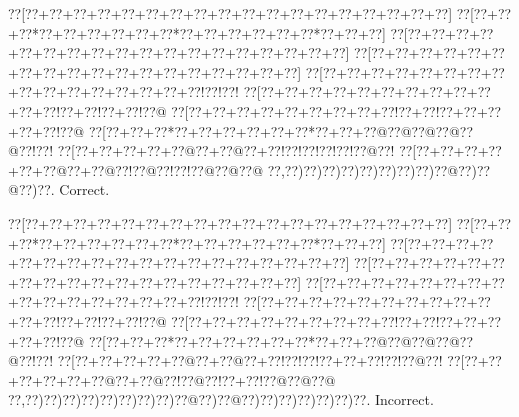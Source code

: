 \documentclass[a5paper]{article}
\begin{document}
\begin{center}
{\goo
\0??[\0??+\0??+\0??+\0??+\0??+\0??+\0??+\0??+\0??+\0??+\0??+\0??+\0??+\0??+\0??+\0??+\0??+\0??]
\0??[\0??+\0??+\0??*\0??+\0??+\0??+\0??+\0??+\0??*\0??+\0??+\0??+\0??+\0??+\0??*\0??+\0??+\0??]
\0??[\0??+\0??+\0??+\0??+\0??+\0??+\0??+\0??+\0??+\0??+\0??+\0??+\0??+\0??+\0??+\0??+\0??+\0??]
\0??[\0??+\0??+\0??+\0??+\0??+\0??+\0??+\0??+\0??+\0??+\0??+\0??+\0??+\0??+\0??+\0??+\0??+\0??]
\0??[\0??+\0??+\0??+\0??+\0??+\0??+\0??+\0??+\0??+\0??+\0??+\0??+\0??+\0??+\0??+\0??!\0??!\0??!
\0??[\0??+\0??+\0??+\0??+\0??+\0??+\0??+\0??+\0??+\0??+\0??+\0??!\0??+\0??!\0??+\0??!\0??@
\0??[\0??+\0??+\0??+\0??+\0??+\0??+\0??+\0??+\0??!\0??+\0??!\0??+\0??+\0??+\0??+\0??!\0??@
\0??[\0??+\0??+\0??*\0??+\0??+\0??+\0??+\0??+\0??*\0??+\0??+\0??@\0??@\0??@\0??@\0??@\0??!\0??!
\0??[\0??+\0??+\0??+\0??+\0??@\0??+\0??@\0??+\0??!\0??!\0??!\0??!\0??!\0??@\0??!
\0??[\0??+\0??+\0??+\0??+\0??+\0??@\0??+\0??@\0??!\0??@\0??!\0??!\0??@\0??@\0??@
\0??,\0??)\0??)\0??)\0??)\0??)\0??)\0??)\0??)\0??@\0??)\0??@\0??)\0??.
}
Correct. 

\end{center}
\begin{center}
{\goo
\0??[\0??+\0??+\0??+\0??+\0??+\0??+\0??+\0??+\0??+\0??+\0??+\0??+\0??+\0??+\0??+\0??+\0??+\0??]
\0??[\0??+\0??+\0??*\0??+\0??+\0??+\0??+\0??+\0??*\0??+\0??+\0??+\0??+\0??+\0??*\0??+\0??+\0??]
\0??[\0??+\0??+\0??+\0??+\0??+\0??+\0??+\0??+\0??+\0??+\0??+\0??+\0??+\0??+\0??+\0??+\0??+\0??]
\0??[\0??+\0??+\0??+\0??+\0??+\0??+\0??+\0??+\0??+\0??+\0??+\0??+\0??+\0??+\0??+\0??+\0??+\0??]
\0??[\0??+\0??+\0??+\0??+\0??+\0??+\0??+\0??+\0??+\0??+\0??+\0??+\0??+\0??+\0??+\0??!\0??!\0??!
\0??[\0??+\0??+\0??+\0??+\0??+\0??+\0??+\0??+\0??+\0??+\0??+\0??!\0??+\0??!\0??+\0??!\0??@
\0??[\0??+\0??+\0??+\0??+\0??+\0??+\0??+\0??+\0??!\0??+\0??!\0??+\0??+\0??+\0??+\0??!\0??@
\0??[\0??+\0??+\0??*\0??+\0??+\0??+\0??+\0??+\0??*\0??+\0??+\0??@\0??@\0??@\0??@\0??@\0??!\0??!
\0??[\0??+\0??+\0??+\0??+\0??@\0??+\0??@\0??+\0??!\0??!\0??!\0??+\0??+\0??!\0??!\0??@\0??!
\0??[\0??+\0??+\0??+\0??+\0??+\0??@\0??+\0??@\0??!\0??@\0??!\0??+\0??!\0??@\0??@\0??@
\0??,\0??)\0??)\0??)\0??)\0??)\0??)\0??)\0??)\0??@\0??)\0??@\0??)\0??)\0??)\0??)\0??)\0??)\0??.
}
Incorrect. 

\end{center}
\newpage
\end{document}
